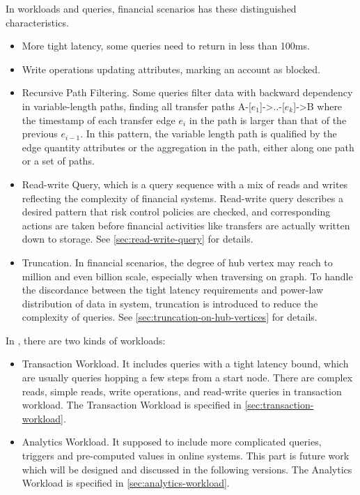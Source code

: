 In workloads and queries, financial scenarios has these distinguished characteristics.
\begin{itemize}
      \item More tight latency, \eg some queries need to return in less than 100ms.
      \item Write operations updating attributes, \eg marking an account as blocked.
      \item Recursive Path Filtering. Some queries filter data with backward dependency
            in variable-length paths, \eg finding all transfer paths A-[${e_1}$]->..-[${e_k}$]->B
            where the timestamp of each transfer edge ${e_i}$ in the path is larger than that of
            the previous ${e_{i-1}}$. In this pattern, the variable length path is qualified by
            the edge quantity attributes or the aggregation in the path, either along one path
            or a set of paths.
      \item Read-write Query, which is a query sequence with a mix of reads and writes reflecting the
            complexity of financial systems. Read-write query describes a desired pattern that risk control
            policies are checked, and corresponding actions are taken before financial activities like
            transfers are actually written down to storage. See \autoref{sec:read-write-query} for details.
      \item Truncation. In financial scenarios, the degree of hub vertex may reach to million and even
            billion scale, especially when traversing on graph. To handle the discordance between the tight
            latency requirements and power-law distribution of data in system, truncation is introduced
            to reduce the complexity of queries. See \autoref{sec:truncation-on-hub-vertices} for details.
\end{itemize}

In \ldbcfinbench, there are two kinds of workloads:
\begin{itemize}
      \item Transaction Workload. It includes queries with a tight latency bound, which are usually
            queries hopping a few steps from a start node. There are complex reads, simple reads, write
            operations, and read-write queries in transaction workload. The Transaction Workload is specified
            in \autoref{sec:transaction-workload}.
      \item Analytics Workload. It supposed to include more complicated queries, \eg triggers and pre-computed
            values in online systems. This part is future work which will be designed and discussed in the
            following versions. The Analytics Workload is specified in \autoref{sec:analytics-workload}.
\end{itemize}


